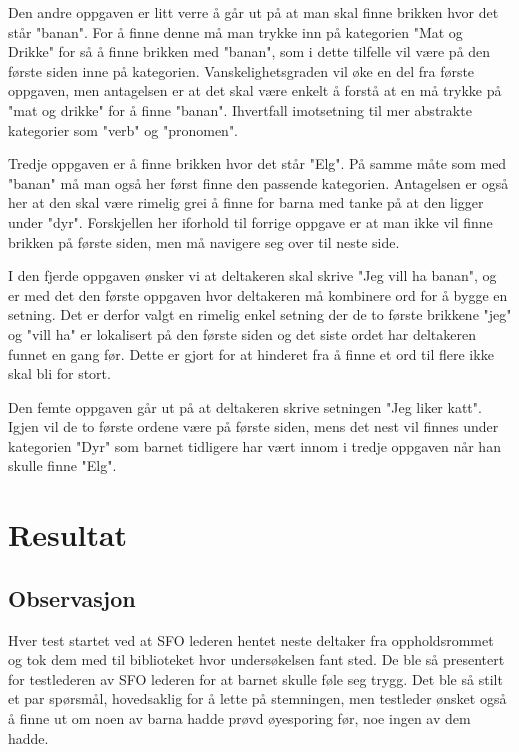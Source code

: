 Den andre oppgaven er litt verre å går ut på at man skal finne brikken hvor det står "banan". For å finne denne må man trykke inn på kategorien "Mat og Drikke" for så å finne brikken med "banan", som i dette tilfelle vil være på den første siden inne på kategorien. Vanskelighetsgraden vil øke en del fra første oppgaven, men antagelsen er at det skal være enkelt å forstå at en må trykke på "mat og drikke" for å finne "banan". Ihvertfall imotsetning til mer abstrakte kategorier som "verb" og "pronomen".

Tredje oppgaven er å finne brikken hvor det står "Elg". På samme måte som med "banan" må man også her først finne den passende kategorien. Antagelsen er også her at den skal være rimelig grei å finne for barna med tanke på at den ligger under "dyr". Forskjellen her iforhold til forrige oppgave er at man ikke vil finne brikken på første siden, men må navigere seg over til neste side.

I den fjerde oppgaven ønsker vi at deltakeren skal skrive "Jeg vill ha banan", og er med det den første oppgaven hvor deltakeren må kombinere ord for å bygge en setning. Det er derfor valgt en rimelig enkel setning der de to første brikkene "jeg" og "vill ha" er lokalisert på den første siden og det siste ordet har deltakeren funnet en gang før. Dette er gjort for at hinderet fra å finne et ord til flere ikke skal bli for stort. 

Den femte oppgaven går ut på at deltakeren skrive setningen "Jeg liker katt". Igjen vil de to første ordene være på første siden, mens det nest vil finnes under kategorien "Dyr" som barnet tidligere har vært innom i tredje oppgaven når han skulle finne "Elg". 

\section{Resultat}

\subsection{Observasjon}

Hver test startet ved at SFO lederen hentet neste deltaker fra oppholdsrommet og tok dem med til biblioteket hvor undersøkelsen fant sted. De ble så presentert for testlederen av SFO lederen for at barnet skulle føle seg trygg. Det ble så stilt et par spørsmål, hovedsaklig for å lette på stemningen, men testleder ønsket også å finne ut om noen av barna hadde prøvd øyesporing før, noe ingen av dem hadde.

